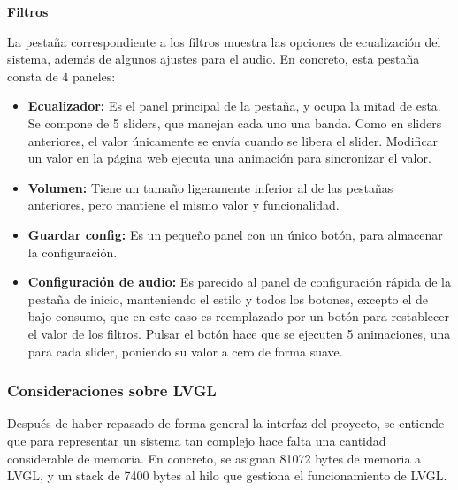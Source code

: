 \textbf{Filtros}

La pestaña correspondiente a los filtros muestra las opciones de ecualización del sistema, además de algunos ajustes para el audio. En concreto, esta pestaña consta de 4 paneles: 
\begin{itemize}
    \item \textbf{Ecualizador:} Es el panel principal de la pestaña, y ocupa la mitad de esta. Se compone de 5 sliders, que manejan cada uno una banda. Como en sliders anteriores, el valor únicamente se envía cuando se libera el slider. Modificar un valor en la página web ejecuta una animación para sincronizar el valor.
    \item \textbf{Volumen:} Tiene un tamaño ligeramente inferior al de las pestañas anteriores, pero mantiene el mismo valor y funcionalidad.
    \item \textbf{Guardar config:} Es un pequeño panel con un único botón, para almacenar la configuración.
    \item \textbf{Configuración de audio:} Es parecido al panel de configuración rápida de la pestaña de inicio, manteniendo el estilo y todos los botones, excepto el de bajo consumo, que en este caso es reemplazado por un botón para restablecer el valor de los filtros. Pulsar el botón hace que se ejecuten 5 animaciones, una para cada slider, poniendo su valor a cero de forma suave.
\end{itemize}

\subsubsection{Consideraciones sobre LVGL}

Después de haber repasado de forma general la interfaz del proyecto, se entiende que para representar un sistema tan complejo hace falta una cantidad considerable de memoria. En concreto, se asignan 81072 bytes de memoria a LVGL, y un stack de 7400 bytes al hilo que gestiona el funcionamiento de LVGL.